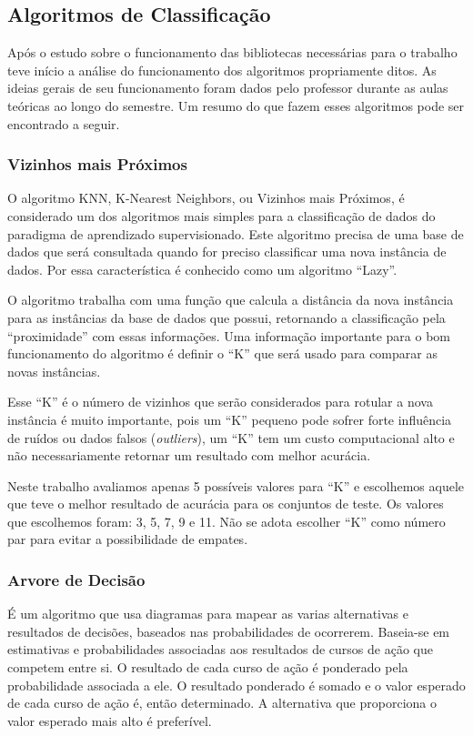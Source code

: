 \documentclass[12pt, a4paper]{article}
\begin{document}
\subsection{Algoritmos de Classificação}
Após o estudo sobre o funcionamento das bibliotecas necessárias para o trabalho teve início a análise do funcionamento dos algoritmos propriamente ditos. As ideias gerais de seu funcionamento foram dados pelo professor durante as aulas teóricas ao longo do semestre. Um resumo do que fazem esses algoritmos pode ser encontrado a seguir.

\subsubsection{Vizinhos mais Próximos}
O algoritmo KNN, K-Nearest Neighbors, ou Vizinhos mais Próximos, é considerado um dos algoritmos mais simples para a classificação de dados do paradigma de aprendizado supervisionado. Este algoritmo precisa de uma base de dados que será consultada quando for preciso classificar uma nova instância de dados. Por essa característica é conhecido como um algoritmo ``Lazy''.

O algoritmo trabalha com uma função que calcula a distância da nova instância para as instâncias da base de dados que possui, retornando a classificação pela ``proximidade'' com essas informações. Uma informação importante para o bom funcionamento do algoritmo é definir o ``K'' que será usado para comparar as novas instâncias.

Esse ``K'' é o número de vizinhos que serão considerados para rotular a nova instância é muito importante, pois um ``K'' pequeno pode sofrer forte influência de  ruídos ou dados falsos (\textit{outliers}), um ``K'' tem um custo computacional alto e não necessariamente retornar um resultado com melhor acurácia.

Neste trabalho avaliamos apenas 5 possíveis valores para ``K'' e escolhemos aquele que teve o melhor resultado de acurácia para os conjuntos de teste. Os valores que escolhemos foram: 3, 5, 7, 9 e 11. Não se adota escolher ``K'' como número par para evitar a possibilidade de empates.

\subsubsection{Arvore de Decisão}
É um algoritmo que usa diagramas para mapear as varias alternativas e resultados de decisões, baseados nas probabilidades de ocorrerem. Baseia-se em estimativas e probabilidades associadas aos resultados de cursos de ação que competem entre si. O resultado de cada curso de ação é ponderado pela probabilidade associada a ele. O resultado ponderado é somado e o valor esperado de cada curso de ação é, então determinado. A alternativa que proporciona o valor esperado mais alto é preferível.
\end{document}
